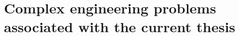 \documentclass[a4paper,12pt,oneside]{book}
\begin{document}
\section{Complex engineering problems associated with the current thesis}
\end{document}
